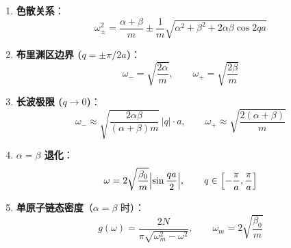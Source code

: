 \begin{formulabox}[核心公式]
\begin{enumerate}[label=\textbf{(\arabic*)}]
    \item \textbf{色散关系}：
    \[
    \omega_{\pm}^2=\frac{\alpha+\beta}{m}\pm\frac{1}{m}\sqrt{\alpha^2+\beta^2+2\alpha\beta\cos 2qa}
    \]

    \item \textbf{布里渊区边界 ($q=\pm\pi/2a$)}：
    \[
    \omega_{-}=\sqrt{\frac{2\alpha}{m}},\qquad \omega_{+}=\sqrt{\frac{2\beta}{m}}
    \]

    \item \textbf{长波极限 ($q\to0$)}：
    \[
    \omega_{-}\approx\sqrt{\frac{2\alpha\beta}{(\alpha+\beta)m}}\,|q|\cdot a,\qquad
    \omega_{+}\approx\sqrt{\frac{2(\alpha+\beta)}{m}}
    \]

    \item \textbf{$\alpha=\beta$ 退化}：
    \[
    \omega=2\sqrt{\frac{\beta_0}{m}}\Bigl|\sin\frac{qa}{2}\Bigr|,\qquad q\in\Bigl[-\frac{\pi}{a},\frac{\pi}{a}\Bigr]
    \]

    \item \textbf{单原子链态密度}（$\alpha=\beta$ 时）：
    \[
    g(\omega)=\frac{2N}{\pi\sqrt{\omega_m^2-\omega^2}},\qquad \omega_m=2\sqrt{\frac{\beta_0}{m}}
    \]
\end{enumerate}
\end{formulabox}

